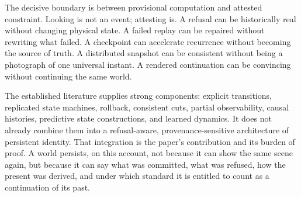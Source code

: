 \documentclass[11pt]{article}
\begin{document}
The decisive boundary is between provisional computation and attested constraint. Looking is not an event; attesting is. A refusal can be historically real without changing physical state. A failed replay can be repaired without rewriting what failed. A checkpoint can accelerate recurrence without becoming the source of truth. A distributed snapshot can be consistent without being a photograph of one universal instant. A rendered continuation can be convincing without continuing the same world.

The established literature supplies strong components: explicit transitions, replicated state machines, rollback, consistent cuts, partial observability, causal histories, predictive state constructions, and learned dynamics. It does not already combine them into a refusal-aware, provenance-sensitive architecture of persistent identity. That integration is the paper's contribution and its burden of proof. A world persists, on this account, not because it can show the same scene again, but because it can say what was committed, what was refused, how the present was derived, and under which standard it is entitled to count as a continuation of its past.
\end{document}
